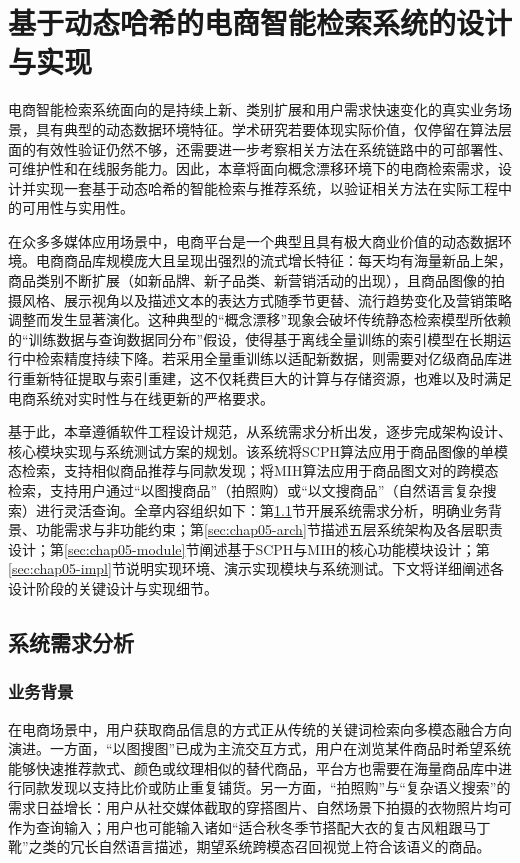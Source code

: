 \setlength{\parskip}{0pt}
\chapter{基于动态哈希的电商智能检索系统的设计与实现}
\label{chap:app}

电商智能检索系统面向的是持续上新、类别扩展和用户需求快速变化的真实业务场景，具有典型的动态数据环境特征。学术研究若要体现实际价值，仅停留在算法层面的有效性验证仍然不够，还需要进一步考察相关方法在系统链路中的可部署性、可维护性和在线服务能力。因此，本章将面向概念漂移环境下的电商检索需求，设计并实现一套基于动态哈希的智能检索与推荐系统，以验证相关方法在实际工程中的可用性与实用性。

在众多多媒体应用场景中，电商平台是一个典型且具有极大商业价值的动态数据环境。电商商品库规模庞大且呈现出强烈的流式增长特征：每天均有海量新品上架，商品类别不断扩展（如新品牌、新子品类、新营销活动的出现），且商品图像的拍摄风格、展示视角以及描述文本的表达方式随季节更替、流行趋势变化及营销策略调整而发生显著演化。这种典型的“概念漂移”现象会破坏传统静态检索模型所依赖的“训练数据与查询数据同分布”假设，使得基于离线全量训练的索引模型在长期运行中检索精度持续下降。若采用全量重训练以适配新数据，则需要对亿级商品库进行重新特征提取与索引重建，这不仅耗费巨大的计算与存储资源，也难以及时满足电商系统对实时性与在线更新的严格要求。

基于此，本章遵循软件工程设计规范，从系统需求分析出发，逐步完成架构设计、核心模块实现与系统测试方案的规划。该系统将SCPH算法应用于商品图像的单模态检索，支持相似商品推荐与同款发现；将MIH算法应用于商品图文对的跨模态检索，支持用户通过“以图搜商品”（拍照购）或“以文搜商品”（自然语言复杂搜索）进行灵活查询。全章内容组织如下：第\ref{sec:chap05-req}节开展系统需求分析，明确业务背景、功能需求与非功能约束；第\ref{sec:chap05-arch}节描述五层系统架构及各层职责设计；第\ref{sec:chap05-module}节阐述基于SCPH与MIH的核心功能模块设计；第\ref{sec:chap05-impl}节说明实现环境、演示实现模块与系统测试。下文将详细阐述各设计阶段的关键设计与实现细节。

\section{系统需求分析}
\label{sec:chap05-req}
\subsection{业务背景}
在电商场景中，用户获取商品信息的方式正从传统的关键词检索向多模态融合方向演进。一方面，“以图搜图”已成为主流交互方式，用户在浏览某件商品时希望系统能够快速推荐款式、颜色或纹理相似的替代商品，平台方也需要在海量商品库中进行同款发现以支持比价或防止重复铺货。另一方面，“拍照购”与“复杂语义搜索”的需求日益增长：用户从社交媒体截取的穿搭图片、自然场景下拍摄的衣物照片均可作为查询输入；用户也可能输入诸如“适合秋冬季节搭配大衣的复古风粗跟马丁靴”之类的冗长自然语言描述，期望系统跨模态召回视觉上符合该语义的商品。


